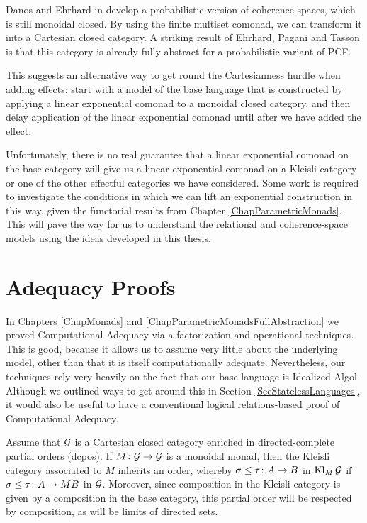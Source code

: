 Danos and Ehrhard in \cite{ProbabilisticCoherenceSpaces} develop a probabilistic version of coherence spaces, which is still monoidal closed.  
By using the finite multiset comonad, we can transform it into a Cartesian closed category.  
A striking result of Ehrhard, Pagani and Tasson \cite{ProbabilisicPcf} is that this category is already fully abstract for a probabilistic variant of PCF.

This suggests an alternative way to get round the Cartesianness hurdle when adding effects: start with a model of the base language that is constructed by applying a linear exponential comonad to a monoidal closed category, and then delay application of the linear exponential comonad until after we have added the effect.

Unfortunately, there is no real guarantee that a linear exponential comonad on the base category will give us a linear exponential comonad on a Kleisli category or one of the other effectful categories we have considered.  
Some work is required to investigate the conditions in which we can lift an exponential construction in this way, given the functorial results from Chapter \ref{ChapParametricMonads}.  
This will pave the way for us to understand the relational and coherence-space models using the ideas developed in this thesis.

\section{Adequacy Proofs}

In Chapters \ref{ChapMonads} and \ref{ChapParametricMonadsFullAbstraction} we proved Computational Adequacy via a factorization and operational techniques.  
This is good, because it allows us to assume very little about the underlying model, other than that it is itself computationally adequate.  
Nevertheless, our techniques rely very heavily on the fact that our base language is Idealized Algol.  
Although we outlined ways to get around this in Section \ref{SecStatelessLanguages}, it would also be useful to have a conventional logical relations-based proof of Computational Adequacy.

Assume that $\mathcal G$ is a Cartesian closed category enriched in directed-complete partial orders (dcpos).
If $M\colon\mathcal G \to \mathcal G$ is a monoidal monad, then the Kleisli category associated to $M$ inherits an order, whereby $\sigma\le\tau\colon A \to B$ in $\operatorname{Kl}_M\mathcal G$ if $\sigma\le\tau\colon A \to MB$ in $\mathcal G$.
Moreover, since composition in the Kleisli category is given by a composition in the base category, this partial order will be respected by composition, as will be limits of directed sets.

